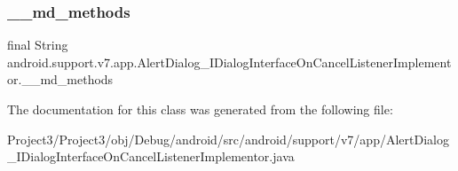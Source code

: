 \subsubsection{\texorpdfstring{\+\_\+\+\_\+md\+\_\+methods}{\_\_md\_methods}}
{\footnotesize\ttfamily final String android.\+support.\+v7.\+app.\+Alert\+Dialog\+\_\+\+I\+Dialog\+Interface\+On\+Cancel\+Listener\+Implementor.\+\_\+\+\_\+md\+\_\+methods\hspace{0.3cm}{\ttfamily [static]}}



The documentation for this class was generated from the following file\+:\begin{DoxyCompactItemize}
\item 
Project3/\+Project3/obj/\+Debug/android/src/android/support/v7/app/Alert\+Dialog\+\_\+\+I\+Dialog\+Interface\+On\+Cancel\+Listener\+Implementor.\+java\end{DoxyCompactItemize}
